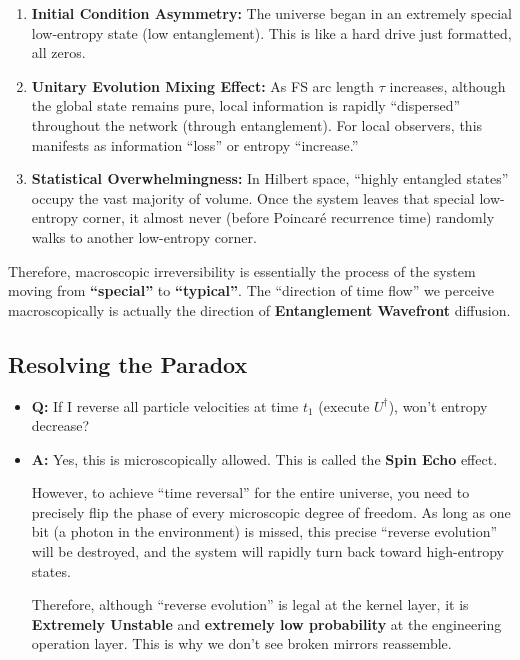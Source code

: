 \documentclass[11pt,a4paper,twoside]{book}
\begin{document}
\begin{enumerate}
\item \textbf{Initial Condition Asymmetry:} The universe began in an extremely special low-entropy state (low entanglement). This is like a hard drive just formatted, all zeros.

\item \textbf{Unitary Evolution Mixing Effect:} As FS arc length $\tau$ increases, although the global state remains pure, local information is rapidly ``dispersed'' throughout the network (through entanglement). For local observers, this manifests as information ``loss'' or entropy ``increase.''

\item \textbf{Statistical Overwhelmingness:} In Hilbert space, ``highly entangled states'' occupy the vast majority of volume. Once the system leaves that special low-entropy corner, it almost never (before Poincaré recurrence time) randomly walks to another low-entropy corner.
\end{enumerate}

Therefore, macroscopic irreversibility is essentially the process of the system moving from \textbf{``special''} to \textbf{``typical''}. The ``direction of time flow'' we perceive macroscopically is actually the direction of \textbf{Entanglement Wavefront} diffusion.

\subsection{Resolving the Paradox}

\begin{itemize}
\item \textbf{Q:} If I reverse all particle velocities at time $t_1$ (execute $U^\dagger$), won't entropy decrease?

\item \textbf{A:} Yes, this is microscopically allowed. This is called the \textbf{Spin Echo} effect.

    However, to achieve ``time reversal'' for the entire universe, you need to precisely flip the phase of every microscopic degree of freedom. As long as one bit (a photon in the environment) is missed, this precise ``reverse evolution'' will be destroyed, and the system will rapidly turn back toward high-entropy states.

    Therefore, although ``reverse evolution'' is legal at the kernel layer, it is \textbf{Extremely Unstable} and \textbf{extremely low probability} at the engineering operation layer. This is why we don't see broken mirrors reassemble.
\end{itemize}
\end{document}
